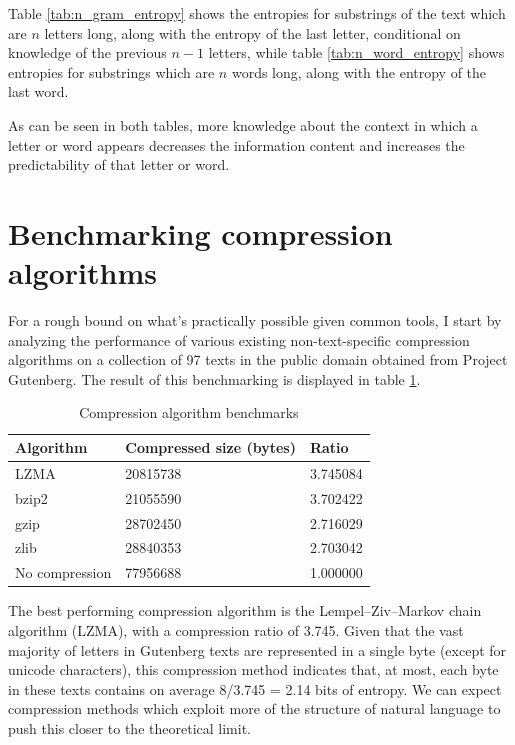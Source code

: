 Table \ref{tab:n_gram_entropy} shows the entropies for substrings of the text which are $n$ letters long, along with the entropy of the last letter, conditional on knowledge of the previous $n-1$ letters, while table \ref{tab:n_word_entropy} shows entropies for substrings which are $n$ words long, along with the entropy of the last word.

As can be seen in both tables, more knowledge about the context in which a letter or word appears decreases the information content and increases the predictability of that letter or word.




\section{Benchmarking compression algorithms}

For a rough bound on what's practically possible given common tools, I start by analyzing the performance of various existing non-text-specific compression algorithms on a collection of 97 texts in the public domain obtained from Project Gutenberg. The result of this benchmarking is displayed in table \ref{tab:compalg_benchmarks}.

\begin{table}[ht]
\centering
\begin{tabular}{ |p{3cm}||p{4cm}|p{3cm}|  }
 \hline
 Algorithm & Compressed size (bytes) & Ratio\\
 \hline
    LZMA & 20815738 & 3.745084\\
    bzip2 & 21055590 & 3.702422\\
    gzip & 28702450 & 2.716029\\
    zlib & 28840353 & 2.703042\\
    No compression & 77956688 & 1.000000\\
 \hline
\end{tabular}
\caption{Compression algorithm benchmarks
\label{tab:compalg_benchmarks}}
\end{table}

The best performing compression algorithm is the Lempel–Ziv–Markov chain algorithm (LZMA), with a compression ratio of 3.745. Given that the vast majority of letters in Gutenberg texts are represented in a single byte (except for unicode characters), this compression method indicates that, at most, each byte in these texts contains on average 8/3.745 = 2.14 bits of entropy. We can expect compression methods which exploit more of the structure of natural language to push this closer to the theoretical limit.

